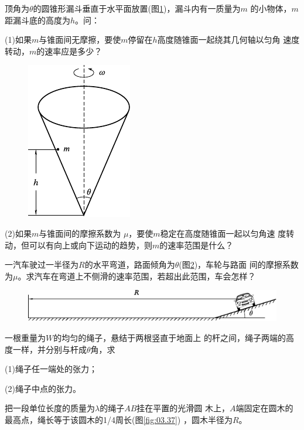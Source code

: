 \begin{exercises}
\exercise 顶角为$ \theta $的圆锥形漏斗垂直于水平面放置(图\ref{fig:03.35})，漏斗内有一质量为$ m $
的小物体，$ m $距漏斗底的高度为$ h $。问：

(1)如果$ m $与锥面间无摩擦，要使$ m $停留在$ h $高度随锥面一起绕其几何轴以匀角
速度转动，$ m $的速率应是多少？

\begin{figure}
  \vspace{-3.12em}
  \centering
  \includegraphics{figure/fig03.35}
  \caption{}
  \label{fig:03.35}
\end{figure}
(2)如果$ m $与锥面间的摩擦系数为 $\mu$，要使$ m $稳定在高度随锥面一起以匀角速
度转动，但可以有向上或向下运动的趋势，则$m$的速率范围是什么？

\exercise 一汽车驶过一半径为$ R $的水平弯道，路面倾角为$ \theta $(图\ref{fig:03.36})，车轮与路面
间的摩擦系数为$ \mu $。求汽车在弯道上不侧滑的速率范围，若超出此范围，车会怎样？

\begin{figure}[h]
  \centering
  \includegraphics{figure/fig03.36}
  \caption{}
  \label{fig:03.36}
\end{figure}

\exercise 一根重量为$ W $的均匀的绳子，悬结于两根竖直于地面上
的杆之间，绳子两端的高度一样，并分别与杆成$ \theta $角，求

(1)绳子任一端处的张力；

(2)绳子中点的张力。

\exercise 把一段单位长度的质量为$ \lambda $的绳子$ AB $挂在平置的光滑圆
木上，$ A $端固定在圆木的最高点，绳长等于该圆木的1/4周长(图\ref{fig:03.37}) ，圆木半径为$ R $。


\end{exercises}
